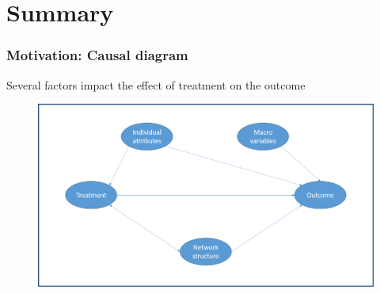 \documentclass{beamer}
\begin{document}


\section*{Summary}


\begin{frame}
\frametitle{Motivation: Causal diagram}
Several factors impact the effect of treatment on the outcome
\begin{figure}
\includegraphics[width=0.8\linewidth]{Causal_diagram_1.png}
\end{figure}
\end{frame}
\end{document}
